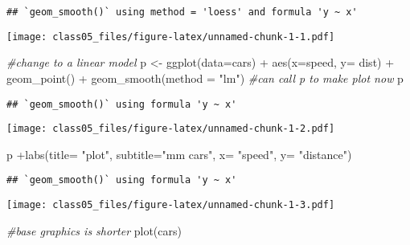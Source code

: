 \documentclass[
]{article}
\newenvironment{Shaded}{\begin{snugshade}}{\end{snugshade}}
\newcommand{\AttributeTok}[1]{\textcolor[rgb]{0.77,0.63,0.00}{#1}}
\newcommand{\CommentTok}[1]{\textcolor[rgb]{0.56,0.35,0.01}{\textit{#1}}}
\newcommand{\FunctionTok}[1]{\textcolor[rgb]{0.00,0.00,0.00}{#1}}
\newcommand{\NormalTok}[1]{#1}
\newcommand{\OtherTok}[1]{\textcolor[rgb]{0.56,0.35,0.01}{#1}}
\newcommand{\SpecialCharTok}[1]{\textcolor[rgb]{0.00,0.00,0.00}{#1}}
\newcommand{\StringTok}[1]{\textcolor[rgb]{0.31,0.60,0.02}{#1}}
\begin{document}
\begin{verbatim}
## `geom_smooth()` using method = 'loess' and formula 'y ~ x'
\end{verbatim}

\texttt{[image: class05\_files/figure-latex/unnamed-chunk-1-1.pdf]}

\begin{Shaded}
\begin{Highlighting}[]
\CommentTok{\#change to a linear model}
\NormalTok{p }\OtherTok{\textless{}{-}} \FunctionTok{ggplot}\NormalTok{(}\AttributeTok{data=}\NormalTok{cars) }\SpecialCharTok{+}
  \FunctionTok{aes}\NormalTok{(}\AttributeTok{x=}\NormalTok{speed, }\AttributeTok{y=}\NormalTok{ dist) }\SpecialCharTok{+}
  \FunctionTok{geom\_point}\NormalTok{() }\SpecialCharTok{+}
  \FunctionTok{geom\_smooth}\NormalTok{(}\AttributeTok{method =} \StringTok{"lm"}\NormalTok{) }
\CommentTok{\#can call p to make plot now }
\NormalTok{p}
\end{Highlighting}
\end{Shaded}

\begin{verbatim}
## `geom_smooth()` using formula 'y ~ x'
\end{verbatim}

\texttt{[image: class05\_files/figure-latex/unnamed-chunk-1-2.pdf]}

\begin{Shaded}
\begin{Highlighting}[]
\NormalTok{p }\SpecialCharTok{+}\FunctionTok{labs}\NormalTok{(}\AttributeTok{title=} \StringTok{"plot"}\NormalTok{,}
        \AttributeTok{subtitle=}\StringTok{"mm cars"}\NormalTok{,}
        \AttributeTok{x=} \StringTok{"speed"}\NormalTok{,}
        \AttributeTok{y=} \StringTok{"distance"}\NormalTok{)}
\end{Highlighting}
\end{Shaded}

\begin{verbatim}
## `geom_smooth()` using formula 'y ~ x'
\end{verbatim}

\texttt{[image: class05\_files/figure-latex/unnamed-chunk-1-3.pdf]}

\begin{Shaded}
\begin{Highlighting}[]
\CommentTok{\#base graphics is shorter}
\FunctionTok{plot}\NormalTok{(cars)}
\end{Highlighting}
\end{Shaded}
\end{document}
